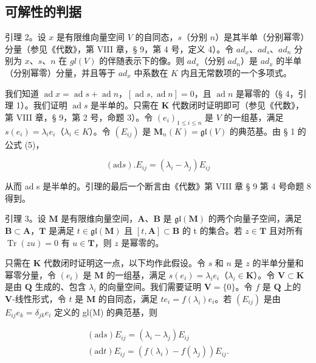 \subsection{可解性的判据}

引理 2。设 \(x\) 是有限维向量空间 \(V\) 的自同态，\(s\)（分别 \(n\)）是其半单（分别幂零）分量（参见《代数》，第 VIII 章，§ 9，第 4 号，定义 4）。令 \(ad_x\)、\(ad_s\)、\(ad_n\) 分别为 \(x\)、\(s\)、\(n\) 在 \(gl(V)\) 的伴随表示下的像。则 \(ad_s\)（分别 \(ad_n\)）是 \(ad_x\) 的半单（分别幂零）分量，并且等于 \(ad_x\) 中系数在 \(K\) 内且无常数项的一个多项式。

我们知道 \(\operatorname{ad} x = \operatorname{ad} s + \operatorname{ad} n\)，\([\operatorname{ad} s, \operatorname{ad} n] = 0\)，且 \(\operatorname{ad} n\) 是幂零的（§ 4，引理 1）。我们证明 \(\operatorname{ad} s\) 是半单的。只需在 \(\mathbf{K}\) 代数闭时证明即可（参见《代数》，第 VIII 章，§ 9，第 2 号，命题 3）。令 \((e_i)_{1 \leq i \leq n}\) 是 \(V\) 的一组基，满足 \(s(e_i) = \lambda_i e_i\)（\(\lambda_i \in K\)）。令 \((E_{ij})\) 是 \(\mathbf{M}_n(K) = \mathfrak{gl}(V)\) 的典范基。由 § 1 的公式 (5)，

\[
(\mathrm{ad} s). E _ {i j} = (\lambda_ {i} - \lambda_ {j}) E _ {i j}
\]

从而 ad s 是半单的。引理的最后一个断言由《代数》第 VIII 章 § 9 第 4 号命题 8 得到。

引理 3。设 \(\mathbf{M}\) 是有限维向量空间，\(\mathbf{A}\)、\(\mathbf{B}\) 是 \(\mathfrak{gl}(\mathbf{M})\) 的两个向量子空间，满足 \(\mathbf{B} \subset \mathbf{A}\)，\(\mathbf{T}\) 是满足 \(t \in \mathfrak{gl}(\mathbf{M})\) 且 \([t, \mathbf{A}] \subset \mathbf{B}\) 的 t 的集合。若 \(z \in \mathbf{T}\) 且对所有 \(\operatorname{Tr}(zu) = 0\) 有 \(u \in \mathbf{T}\)，则 \(z\) 是幂零的。

只需在 \(\mathbf{K}\) 代数闭时证明这一点，以下均作此假设。令 \(s\) 和 \(n\) 是 \(z\) 的半单分量和幂零分量，令 \((e_i)\) 是 \(\mathbf{M}\) 的一组基，满足 \(s(e_i) = \lambda_i e_i\)（\(\lambda_i \in \mathbf{K}\)）。令 \(\mathbf{V} \subset \mathbf{K}\) 是由 \(\mathbf{Q}\) 生成的、包含 \(\lambda_i\) 的向量空间。我们需要证明 \(\mathbf{V} = \{0\}\)。令 \(f\) 是 \(\mathbf{Q}\) 上的 \(\mathbf{V}\)-线性形式，令 \(t\) 是 \(\mathbf{M}\) 的自同态，满足 \(te_{i}=f(\lambda_{i})e_{i}\)。若 \((E_{ij})\) 是由 \(E_{ij}e_{k}=\delta_{jk}e_{i}\) 定义的 gl(M) 的典范基，则

\[
\begin{array}{l} (\mathrm{ad} s) E _ {i j} = (\lambda_ {i} - \lambda_ {j}) E _ {i j} \\ (\mathrm{ad} t) E _ {i j} = (f (\lambda_ {i}) - f (\lambda_ {j})) E _ {i j}. \end{array}
\]

